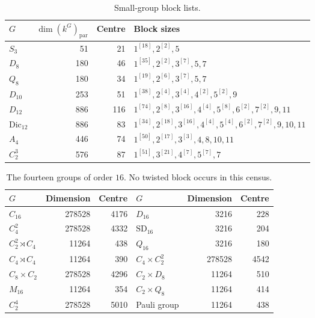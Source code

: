 \documentclass[11pt]{amsart}
\theoremstyle{definition}
\begin{document}
\begin{table}[ht]
\centering\small
\begin{tabular}{@{}lrrl@{}}
\toprule
$G$ & $\dim (k^G)_{\mathrm{par}}$ & Centre & Block sizes \\
\midrule
$S_3$ & 51 & 21 & $1^{[18]},2^{[2]},5$\\
$D_8$ & 180 & 46 & $1^{[35]},2^{[2]},3^{[7]},5,7$\\
$Q_8$ & 180 & 34 & $1^{[19]},2^{[6]},3^{[7]},5,7$\\
$D_{10}$ & 253 & 51 & $1^{[38]},2^{[4]},3^{[4]},4^{[2]},5^{[2]},9$\\
$D_{12}$ & 886 & 116 & $1^{[74]},2^{[8]},3^{[16]},4^{[4]},5^{[8]},6^{[2]},7^{[2]},9,11$\\
$\mathrm{Dic}_{12}$ & 886 & 83 & $1^{[34]},2^{[18]},3^{[16]},4^{[4]},5^{[4]},6^{[2]},7^{[2]},9,10,11$\\
$A_4$ & 446 & 74 & $1^{[50]},2^{[17]},3^{[3]},4,8,10,11$\\
$C_2^3$ & 576 & 87 & $1^{[51]},3^{[21]},4^{[7]},5^{[7]},7$\\
\bottomrule
\end{tabular}
\caption{Small-group block lists.}
\label{small}
\end{table}

\begin{table}[ht]
\centering\small
\begin{tabular}{@{}lrr|lrr@{}}
\toprule
$G$ & Dimension & Centre & $G$ & Dimension & Centre \\
\midrule
$C_{16}$ & 278528 & 4176 & $D_{16}$ & 3216 & 228\\
$C_4^2$ & 278528 & 4332 & $\mathrm{SD}_{16}$ & 3216 & 204\\
$C_2^2\rtimes C_4$ & 11264 & 438 & $Q_{16}$ & 3216 & 180\\
$C_4\rtimes C_4$ & 11264 & 390 & $C_4\times C_2^2$ & 278528 & 4542\\
$C_8\times C_2$ & 278528 & 4296 & $C_2\times D_8$ & 11264 & 510\\
$M_{16}$ & 11264 & 354 & $C_2\times Q_8$ & 11264 & 414\\
$C_2^4$ & 278528 & 5010 & Pauli group & 11264 & 438\\
\bottomrule
\end{tabular}
\caption{The fourteen groups of order $16$. No twisted block occurs in this census.}
\end{table}
\end{document}
